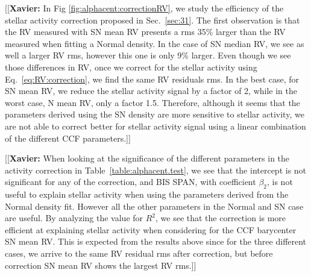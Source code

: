 \documentclass{aa}
\newcommand{\xavier}[1]{{\color{blue}[[\textbf{Xavier: }#1]]}}
\begin{document}
\xavier{In Fig \ref{fig:alphacent:correctionRV}, we study the efficiency of the stellar activity correction proposed in Sec.~\ref{sec:31}. The first observation is that the RV measured with SN mean RV presents a rms 35\% larger than the RV measured when fitting a Normal density. In the case of SN median RV, we see as well a larger RV rms, however this one is only 9\% larger. Even though we see those differences in RV, once we correct for the stellar activity using Eq.~\ref{eq:RV:correction}, we find the same RV residuals rms. In the best case, for SN mean RV, we reduce the stellar activity signal by a factor of 2, while in the worst case, N mean RV, only a factor 1.5. Therefore, although it seems that the parameters derived using the SN density are more sensitive to stellar activity, we are not able to correct better for stellar activity signal using a linear combination of the different CCF parameters.}

\xavier{When looking at the significance of the different parameters in the activity correction in Table~\ref{table:alphacent.test}, we see that the intercept is not significant for any of the correction, and BIS SPAN, with coefficient $\beta_2$, is not useful to explain stellar activity when using the parameters derived from the Normal density fit. However all the other parameters in the Normal and SN case are useful. By analyzing the value for $R^2$, we see that the correction is more efficient at explaining stellar activity when considering for the CCF barycenter SN mean RV. This is expected from the results above since for the three different cases, we arrive to the same RV residual rms after correction, but before correction SN mean RV shows the largest RV rms.}
\end{document}

